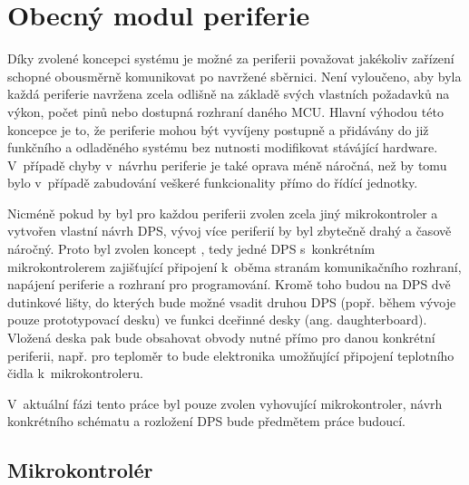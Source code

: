 \chapter{Obecný modul periferie}


    Díky zvolené koncepci systému je možné za periferii považovat jakékoliv zařízení schopné obousměrně komunikovat po navržené sběrnici. Není vyloučeno, aby byla každá periferie navržena zcela odlišně na základě svých vlastních požadavků na výkon, počet pinů nebo dostupná rozhraní daného MCU. Hlavní výhodou této koncepce je to, že periferie mohou být vyvíjeny postupně a přidávány do již funkčního a odladěného systému bez nutnosti modifikovat stávájící hardware. V~případě chyby v~návrhu periferie je také oprava méně náročná, než by tomu bylo v~případě zabudování veškeré funkcionality přímo do řídící jednotky. 

    Nicméně pokud by byl pro každou periferii zvolen zcela jiný mikrokontroler a vytvořen vlastní návrh DPS, vývoj více periferií by byl zbytečně drahý a časově náročný. Proto byl zvolen koncept , tedy jedné DPS s~konkrétním mikrokontrolerem zajišťující připojení k~oběma stranám komunikačního rozhraní, napájení periferie a rozhraní pro programování. Kromě toho budou na DPS dvě dutinkové lišty, do kterých bude možné vsadit druhou DPS (popř. během vývoje pouze prototypovací desku) ve funkci dceřinné desky (ang. daughterboard). Vložená deska pak bude obsahovat obvody nutné přímo pro danou konkrétní periferii, např. pro teploměr to bude elektronika umožňující připojení teplotního čidla k~mikrokontroleru. 

    V~aktuální fázi tento práce byl pouze zvolen vyhovující mikrokontroler, návrh konkrétního schématu a rozložení DPS bude předmětem práce budoucí. 
    
    \section{Mikrokontrolér}


